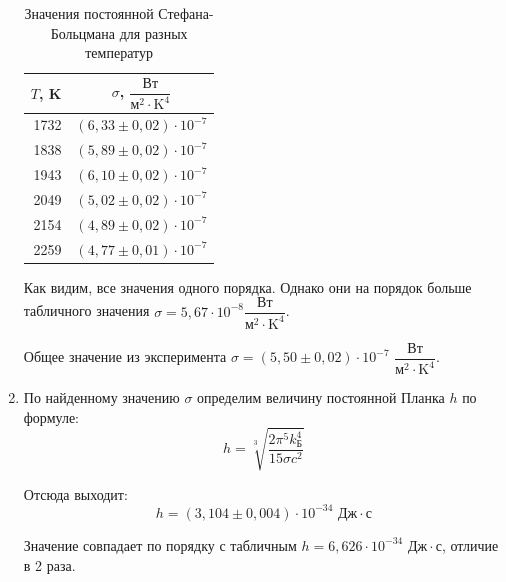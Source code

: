 \begin{enumerate}
		\newpage
		\renewcommand{\arraystretch}{2.2}
		\begin{table}[h!]
			\centering
				\begin{tabular}{|r|r|}
					\hline
					$T$, K & \multicolumn{1}{c|}{$\sigma$, $\dfrac{\text{Вт}}{\text{м}^2 \cdot \text{K}^4}$} \\ \hline
					1732   & $(6,33 \pm 0,02) \cdot 10^{-7}$                                                 \\ \hline
					1838   & $(5,89 \pm 0,02) \cdot 10^{-7}$                                                 \\ \hline
					1943   & $(6,10 \pm 0,02) \cdot 10^{-7}$                                                 \\ \hline
					2049   & $(5,02 \pm 0,02) \cdot 10^{-7}$                                                 \\ \hline
					2154   & $(4,89 \pm 0,02) \cdot 10^{-7}$                                                 \\ \hline
					2259   & $(4,77 \pm 0,01) \cdot 10^{-7}$                                                 \\ \hline
				\end{tabular}
				\caption{Значения постоянной Стефана-Больцмана для разных температур}
				\label{Stefan_Boltz_Sigma_Table}
		\end{table}
	
		Как видим, все значения одного порядка. Однако они на порядок больше табличного значения $\sigma = 5,67 \cdot 10^{-8} \dfrac{\text{Вт}}{\text{м}^2 \cdot \text{K}^4}$.
		
		Общее значение из эксперимента $\sigma = (5,50 \pm 0,02) \cdot 10^{-7}$ $\dfrac{\text{Вт}}{\text{м}^2 \cdot \text{K}^4}$.
		
		
		\item По найденному значению $\sigma$ определим величину постоянной Планка $h$ по формуле:
		\begin{equation*}
			h = \sqrt[3]{\frac{2\pi^5 k_\text{Б}^4}{15\sigma c^2}}
		\end{equation*}
	
		Отсюда выходит:
		\begin{equation*}
			h = (3,104 \pm 0,004) \cdot 10^{-34} \text{ Дж}\cdot\text{с}
		\end{equation*}
	
		Значение совпадает по порядку с табличным $h = 6,626 \cdot 10^{-34}  \text{ Дж}\cdot\text{с}$, отличие в 2 раза.
	\end{enumerate}


